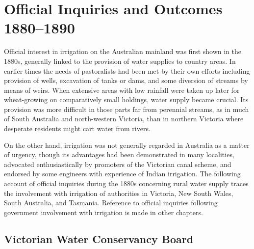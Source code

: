 
\chapter{Official Inquiries and Outcomes 1880--1890}

\label{ch:inquiries}

\setcounter{endnote}{0}

Official interest in irrigation on the Australian mainland was first
sh\-own in the 1880s, generally linked to the provision of water
supplies to country areas.  In earlier times the needs of pastoralists
had been met by their own efforts including provision of wells,
excavation of tanks or dams, and some diversion of streams by means of
weirs.  When extensive areas with low rainfall were taken up later for
wheat-growing on comparatively small holdings, water
supply became crucial.  Its provision was more difficult in those
parts far from perennial streams, as in much of South Australia and
north-western Victoria, than in northern Victoria where desperate
residents might cart water from rivers.

On the other hand, irrigation was not generally regarded in Australia
as a matter of urgency, though its advantages had been demonstrated in
many localities, advocated enthusiastically by promoters of the
Victorian canal scheme, and
endorsed by some engineers with experience of Indian irrigation.  The
following account of official inquiries during the 1880s concerning
rural water supply traces the involvement with irrigation of
authorities in Victoria, New South Wales, South Australia, and
Tasmania.  Reference to official inquiries following government
involvement with irrigation is made in other chapters.

\section*{Victorian Water Conservancy Board}

